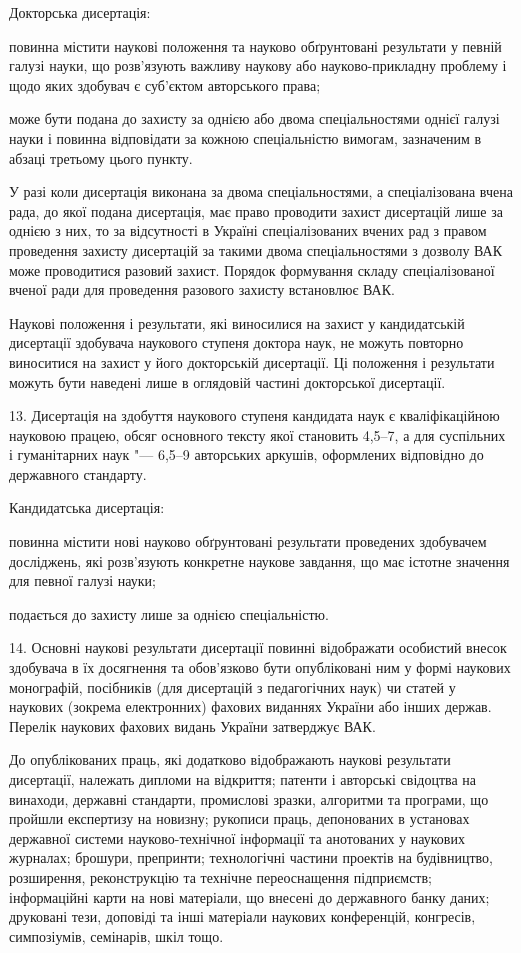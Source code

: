 \documentclass[
]{mon2017dev-aref}[2021/04/12]
\theoremstyle{plain}
\theoremstyle{definition}
\theoremstyle{remark}
\begin{document}
Докторська дисертація:

повинна містити наукові положення та науково обґрунтовані
результати у певній галузі науки, що розв'язують важливу наукову
або науково-прикладну проблему і щодо яких здобувач є суб'єктом
авторського права;

може бути подана до захисту за однією або двома спеціальностями
однієї галузі науки і повинна відповідати за кожною спеціальністю
вимогам, зазначеним в абзаці третьому цього пункту.

У разі коли дисертація виконана за двома спеціальностями, а
спеціалізована вчена рада, до якої подана дисертація, має право
проводити захист дисертацій лише за однією з них, то за
відсутності в Україні спеціалізованих вчених рад з правом
проведення захисту дисертацій за такими двома спеціальностями з
дозволу ВАК може проводитися разовий захист. Порядок формування
складу спеціалізованої вченої ради для проведення разового захисту
встановлює ВАК.

Наукові положення і результати, які виносилися на захист у
кандидатській дисертації здобувача наукового ступеня доктора наук,
не можуть повторно виноситися на захист у його докторській
дисертації. Ці положення і результати можуть бути наведені лише в
оглядовій частині докторської дисертації.

13. Дисертація на здобуття наукового ступеня кандидата наук є
кваліфікаційною науковою працею, обсяг основного тексту якої
становить 4,5--7, а для суспільних і гуманітарних наук "--- 6,5--9
авторських аркушів, оформлених відповідно до державного стандарту.

Кандидатська дисертація:

повинна містити нові науково обґрунтовані результати проведених
здобувачем досліджень, які розв'язують конкретне наукове завдання,
що має істотне значення для певної галузі науки;

подається до захисту лише за однією спеціальністю.

14. Основні наукові результати дисертації повинні відображати
особистий внесок здобувача в їх досягнення та обов'язково бути
опубліковані ним у формі наукових монографій, посібників (для
дисертацій з педагогічних наук) чи статей у наукових (зокрема
електронних) фахових виданнях України або інших держав. Перелік
наукових фахових видань України затверджує ВАК.

До опублікованих праць, які додатково відображають наукові
результати дисертації, належать дипломи на відкриття; патенти і
авторські свідоцтва на винаходи, державні стандарти, промислові
зразки, алгоритми та програми, що пройшли експертизу на новизну;
рукописи праць, депонованих в установах державної системи
науково-технічної інформації та анотованих у наукових журналах;
брошури, препринти; технологічні частини проектів на будівництво,
розширення, реконструкцію та технічне переоснащення підприємств;
інформаційні карти на нові матеріали, що внесені до державного
банку даних; друковані тези, доповіді та інші матеріали наукових
конференцій, конгресів, симпозіумів, семінарів, шкіл тощо.
\end{document}

